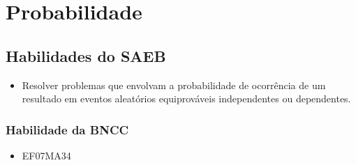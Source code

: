 \chapter{Probabilidade}

\vspace*{-1cm}

\section*{Habilidades do SAEB }
\begin{itemize}
\item Resolver problemas que envolvam a probabilidade de
ocorrência de um resultado em eventos aleatórios equiprováveis
independentes ou dependentes.
\end{itemize}

\subsection{Habilidade da BNCC}
\begin{itemize}
  \item EF07MA34
  \end{itemize}


